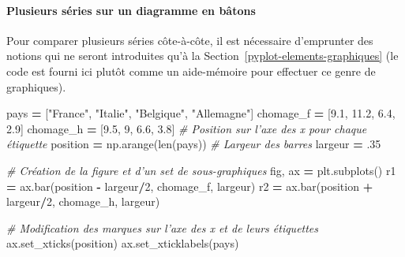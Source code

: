 \documentclass[12pt,]{book}
\newenvironment{Shaded}{\begin{snugshade}}{\end{snugshade}}
\newcommand{\DecValTok}[1]{\textcolor[rgb]{0.00,0.00,0.81}{#1}}
\newcommand{\FloatTok}[1]{\textcolor[rgb]{0.00,0.00,0.81}{#1}}
\newcommand{\StringTok}[1]{\textcolor[rgb]{0.31,0.60,0.02}{#1}}
\newcommand{\CommentTok}[1]{\textcolor[rgb]{0.56,0.35,0.01}{\textit{#1}}}
\newcommand{\OperatorTok}[1]{\textcolor[rgb]{0.81,0.36,0.00}{\textbf{#1}}}
\newcommand{\BuiltInTok}[1]{#1}
\newcommand{\NormalTok}[1]{#1}
\let\oldparagraph\paragraph
\renewcommand{\paragraph}[1]{\oldparagraph{#1}\mbox{}}
\numberwithin{equation}{section}
\numberwithin{countremarque}{section}
\begin{document}
\paragraph{Plusieurs séries sur un diagramme en
bâtons}\label{plusieurs-series-sur-un-diagramme-en-batons}

Pour comparer plusieurs séries côte-à-côte, il est nécessaire
d'emprunter des notions qui ne seront introduites qu'à la
Section~\ref{pyplot-elements-graphiques} (le code est fourni ici plutôt
comme un aide-mémoire pour effectuer ce genre de graphiques).

\begin{Shaded}
\begin{Highlighting}[]
\NormalTok{pays }\OperatorTok{=}\NormalTok{ [}\StringTok{"France"}\NormalTok{, }\StringTok{"Italie"}\NormalTok{, }\StringTok{"Belgique"}\NormalTok{, }\StringTok{"Allemagne"}\NormalTok{]}
\NormalTok{chomage_f }\OperatorTok{=}\NormalTok{ [}\FloatTok{9.1}\NormalTok{, }\FloatTok{11.2}\NormalTok{, }\FloatTok{6.4}\NormalTok{, }\FloatTok{2.9}\NormalTok{]}
\NormalTok{chomage_h }\OperatorTok{=}\NormalTok{ [}\FloatTok{9.5}\NormalTok{, }\DecValTok{9}\NormalTok{, }\FloatTok{6.6}\NormalTok{, }\FloatTok{3.8}\NormalTok{]}
\CommentTok{# Position sur l'axe des x pour chaque étiquette}
\NormalTok{position }\OperatorTok{=}\NormalTok{ np.arange(}\BuiltInTok{len}\NormalTok{(pays))}
\CommentTok{# Largeur des barres}
\NormalTok{largeur }\OperatorTok{=}\NormalTok{ .}\DecValTok{35}

\CommentTok{# Création de la figure et d'un set de sous-graphiques}
\NormalTok{fig, ax }\OperatorTok{=}\NormalTok{ plt.subplots()}
\NormalTok{r1 }\OperatorTok{=}\NormalTok{ ax.bar(position }\OperatorTok{-}\NormalTok{ largeur}\OperatorTok{/}\DecValTok{2}\NormalTok{, chomage_f, largeur)}
\NormalTok{r2 }\OperatorTok{=}\NormalTok{ ax.bar(position }\OperatorTok{+}\NormalTok{ largeur}\OperatorTok{/}\DecValTok{2}\NormalTok{, chomage_h, largeur)}

\CommentTok{# Modification des marques sur l'axe des x et de leurs étiquettes}
\NormalTok{ax.set_xticks(position)}
\NormalTok{ax.set_xticklabels(pays)}
\end{Highlighting}
\end{Shaded}
\end{document}
